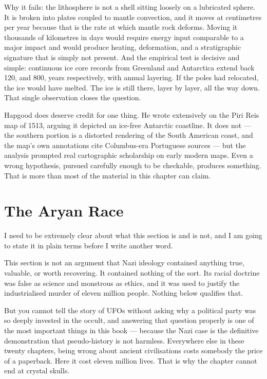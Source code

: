 Why it fails: the lithosphere is not a shell sitting loosely on a lubricated sphere. It is broken into
plates coupled to mantle convection, and it moves at centimetres per year because that is the rate at
which mantle rock deforms. Moving it thousands of kilometres in days would require energy input
comparable to a major impact and would produce heating, deformation, and a stratigraphic signature
that is simply not present. And the empirical test is decisive and simple: continuous ice core records
from Greenland and Antarctica extend back 120, and 800, years respectively, with annual
layering. If the poles had relocated, the ice would have melted. The ice is still there, layer by
layer, all the way down. That single observation closes the question.

\begin{funfact}
Hapgood does deserve credit for one thing. He wrote extensively on the Piri Reis map of 1513, arguing
it depicted an ice-free Antarctic coastline. It does not --- the southern portion is a distorted
rendering of the South American coast, and the map's own annotations cite Columbus-era Portuguese
sources --- but the analysis prompted real cartographic scholarship on early modern maps. Even a
wrong hypothesis, pursued carefully enough to be checkable, produces something. That is more than
most of the material in this chapter can claim.
\end{funfact}

\section{The Aryan Race}\label{sec:aryan}

I need to be extremely clear about what this section is and is not, and I am going to state it in
plain terms before I write another word.

This section is not an argument that Nazi ideology contained anything true, valuable, or worth
recovering. It contained nothing of the sort. Its racial doctrine was false as science and monstrous
as ethics, and it was used to justify the industrialised murder of eleven million people. Nothing
below qualifies that.

But you cannot tell the story of UFOs without asking why a political party was so deeply invested in
the occult, and answering that question properly is one of the most important things in this book ---
because the Nazi case is the definitive demonstration that pseudo-history is not harmless. Everywhere
else in these twenty chapters, being wrong about ancient civilisations costs somebody the price of a
paperback. Here it cost eleven million lives. That is why the chapter cannot end at crystal skulls.

